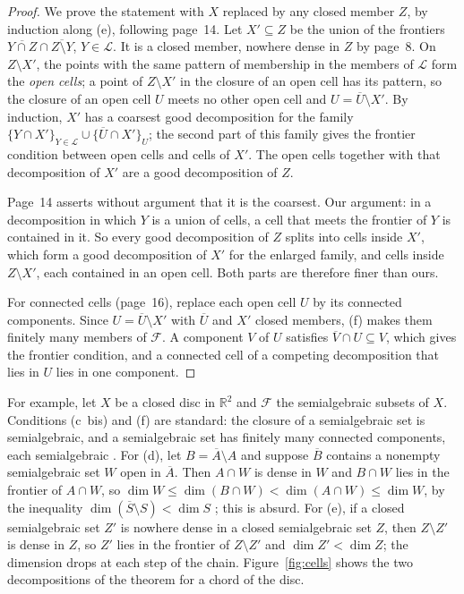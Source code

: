 \documentclass[11pt,a4paper]{amsart}
\theoremstyle{definition}
\theoremstyle{remark}
\begin{document}
\begin{proof}
We prove the statement with $X$ replaced by any closed member $Z$, by induction along (e), following page~14. Let $X' \subseteq Z$ be the union of the frontiers $\overline{Y \cap Z} \cap \overline{Z \setminus Y}$, $Y \in \mathcal L$. It is a closed member, nowhere dense in $Z$ by page~8. On $Z \setminus X'$, the points with the same pattern of membership in the members of $\mathcal L$ form the \emph{open cells}; a point of $Z \setminus X'$ in the closure of an open cell has its pattern, so the closure of an open cell $U$ meets no other open cell and $U = \overline U \setminus X'$. By induction, $X'$ has a coarsest good decomposition for the family $\{Y \cap X'\}_{Y \in \mathcal L} \cup \{\overline U \cap X'\}_U$; the second part of this family gives the frontier condition between open cells and cells of $X'$. The open cells together with that decomposition of $X'$ are a good decomposition of $Z$.

Page~14 asserts without argument that it is the coarsest. Our argument: in a decomposition in which $Y$ is a union of cells, a cell that meets the frontier of $Y$ is contained in it. So every good decomposition of $Z$ splits into cells inside $X'$, which form a good decomposition of $X'$ for the enlarged family, and cells inside $Z \setminus X'$, each contained in an open cell. Both parts are therefore finer than ours.

For connected cells (page~16), replace each open cell $U$ by its connected components. Since $U = \overline U \setminus X'$ with $\overline U$ and $X'$ closed members, (f) makes them finitely many members of $\mathcal F$. A component $V$ of $U$ satisfies $\overline V \cap U \subseteq V$, which gives the frontier condition, and a connected cell of a competing decomposition that lies in $U$ lies in one component.
\end{proof}

For example, let $X$ be a closed disc in $\mathbb R^2$ and $\mathcal F$ the semialgebraic subsets of $X$. Conditions (c~bis) and (f) are standard: the closure of a semialgebraic set is semialgebraic, and a semialgebraic set has finitely many connected components, each semialgebraic \cite[Ch.~2 and~3]{vandendries1998}. For (d), let $B = \overline A \setminus A$ and suppose $\overline B$ contains a nonempty semialgebraic set $W$ open in $\overline A$. Then $A \cap W$ is dense in $W$ and $B \cap W$ lies in the frontier of $A \cap W$, so $\dim W \le \dim (B \cap W) < \dim (A \cap W) \le \dim W$, by the inequality $\dim(\overline S \setminus S) < \dim S$ \cite[Ch.~4]{vandendries1998}; this is absurd. For (e), if a closed semialgebraic set $Z'$ is nowhere dense in a closed semialgebraic set $Z$, then $Z \setminus Z'$ is dense in $Z$, so $Z'$ lies in the frontier of $Z \setminus Z'$ and $\dim Z' < \dim Z$; the dimension drops at each step of the chain. Figure~\ref{fig:cells} shows the two decompositions of the theorem for a chord of the disc.
\end{document}
